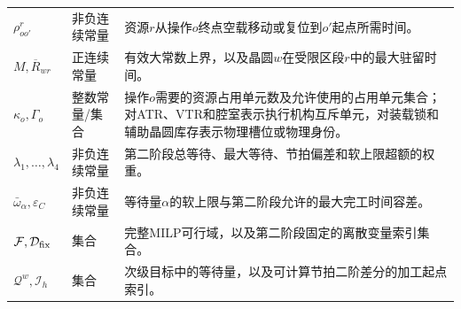 \documentclass[final,5p,times,twocolumn]{elsarticle}
\begin{document}
\begin{table}[t]
\begin{tabular}{p{}p{}p{}}
$\rho^r_{oo'}$ & 非负连续常量 & 资源$r$从操作$o$终点空载移动或复位到$o'$起点所需时间。\\
$M,\overline R_{wr}$ & 正连续常量 & 有效大常数上界，以及晶圆$w$在受限区段$r$中的最大驻留时间。\\
$\kappa_o,\Gamma_o$ & 整数常量/集合 & 操作$o$需要的资源占用单元数及允许使用的占用单元集合；对ATR、VTR和腔室表示执行机构互斥单元，对装载锁和辅助晶圆库存表示物理槽位或物理身份。\\
$\lambda_1,\ldots,\lambda_4$ & 非负连续常量 & 第二阶段总等待、最大等待、节拍偏差和软上限超额的权重。\\
$\bar\omega_\alpha,\varepsilon_C$ & 非负连续常量 & 等待量$\alpha$的软上限与第二阶段允许的最大完工时间容差。\\
$\mathcal F,\mathcal D_{\rm fix}$ & 集合 & 完整MILP可行域，以及第二阶段固定的离散变量索引集合。\\
$\mathcal Q^w,\mathcal I_h$ & 集合 & 次级目标中的等待量，以及可计算节拍二阶差分的加工起点索引。\\
\bottomrule
\end{tabular}
\end{table}
\end{document}
